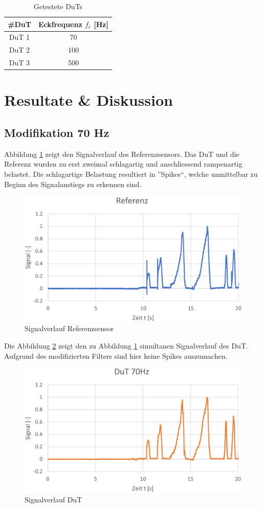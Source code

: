 \begin{table}[H]
	\centering
	\caption{Getestete DuTs}
	\begin{tabular}{c|c}
		\textbf{\#DuT} &\textbf{ Eckfrequenz $f_c$ [Hz]}\\
		\hline
		DuT 1 & 70 \\
		DuT 2 & 100\\
		DuT 3 & 500\\
	\end{tabular}	
	\label{tab:params}
\end{table}
	\section{Resultate \& Diskussion}
	\subsection{Modifikation 70 Hz}
Abbildung \ref{fig:refsolo} zeigt den Signalverlauf des Referenzsensors. Das DuT und die Referenz wurden zu erst zweimal schlagartig  und anschliessend rampenartig belastet. Die schlagartige Belastung resultiert in ''Spikes``, welche unmittelbar zu Beginn des Signalanstiegs zu erkennen sind.
	\begin{figure}[H]
		\centering
		\includegraphics[width=1\linewidth]{img_70Hz/ref_solo}
		\caption{Signalverlauf Referenzsensor}
		\label{fig:refsolo}
	\end{figure}
\noindent Die Abbildung \ref{fig:dutsolo} zeigt den zu Abbildung \ref{fig:refsolo} simultanen Signalverlauf des DuT. Aufgrund des modifizierten Filters sind hier keine Spikes auszumachen. 
	\begin{figure}[H]
		\centering
		\includegraphics[width=1\linewidth]{img_70Hz/dut_solo}
		\caption{Signalverlauf DuT}
		\label{fig:dutsolo}
	\end{figure}
